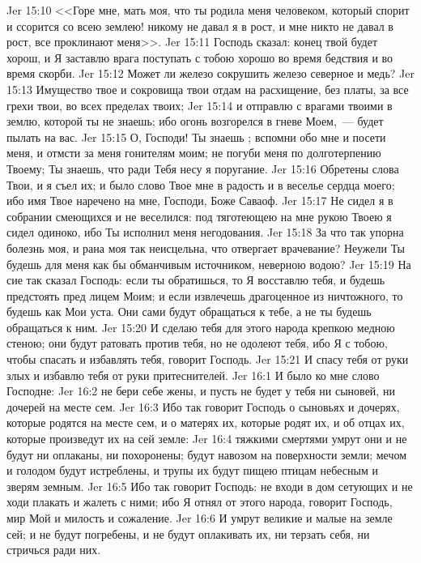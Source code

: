 \vs Jer 15:10 <<Горе мне, мать моя, что ты родила меня человеком, который спорит и ссорится со всею землею! никому не давал я в рост, и мне никто не давал в рост,  все проклинают меня>>.
\rsbpar\vs Jer 15:11 Господь сказал: конец твой будет хорош, и Я заставлю врага поступать с тобою хорошо во время бедствия и во время скорби.
\vs Jer 15:12 Может ли железо сокрушить железо северное и медь?
\vs Jer 15:13 Имущество твое и сокровища твои отдам на расхищение, без платы, за все грехи твои, во всех пределах твоих;
\vs Jer 15:14 и отправлю с врагами твоими в землю, которой ты не знаешь; ибо огонь возгорелся в гневе Моем,~--- будет пылать на вас.
\vs Jer 15:15 О, Господи! Ты знаешь ; вспомни обо мне и посети меня, и отмсти за меня гонителям моим; не погуби меня по долготерпению Твоему; Ты знаешь, что ради Тебя несу я поругание.
\vs Jer 15:16 Обретены слова Твои, и я съел их; и было слово Твое мне в радость и в веселье сердца моего; ибо имя Твое наречено на мне, Господи, Боже Саваоф.
\vs Jer 15:17 Не сидел я в собрании смеющихся и не веселился: под тяготеющею на мне рукою Твоею я сидел одиноко, ибо Ты исполнил меня негодования.
\vs Jer 15:18 За что так упорна болезнь моя, и рана моя так неисцельна, что отвергает врачевание? Неужели Ты будешь для меня как бы обманчивым источником, неверною водою?
\vs Jer 15:19 На сие так сказал Господь: если ты обратишься, то Я восставлю тебя, и будешь предстоять пред лицем Моим; и если извлечешь драгоценное из ничтожного, то будешь как Мои уста. Они сами будут обращаться к тебе, а не ты будешь обращаться к ним.
\vs Jer 15:20 И сделаю тебя для этого народа крепкою медною стеною; они будут ратовать против тебя, но не одолеют тебя, ибо Я с тобою, чтобы спасать и избавлять тебя, говорит Господь.
\vs Jer 15:21 И спасу тебя от руки злых и избавлю тебя от руки притеснителей.
\vs Jer 16:1 И было ко мне слово Господне:
\vs Jer 16:2 не бери себе жены, и пусть не будет у тебя ни сыновей, ни дочерей на месте сем.
\vs Jer 16:3 Ибо так говорит Господь о сыновьях и дочерях, которые родятся на месте сем, и о матерях их, которые родят их, и об отцах их, которые произведут их на сей земле:
\vs Jer 16:4 тяжкими смертями умрут они и не будут ни оплаканы, ни похоронены; будут навозом на поверхности земли; мечом и голодом будут истреблены, и трупы их будут пищею птицам небесным и зверям земным.
\vs Jer 16:5 Ибо так говорит Господь: не входи в дом сетующих и не ходи плакать и жалеть с ними; ибо Я отнял от этого народа, говорит Господь, мир Мой и милость и сожаление.
\vs Jer 16:6 И умрут великие и малые на земле сей; и не будут погребены, и не будут оплакивать их, ни терзать себя, ни стричься ради них.
